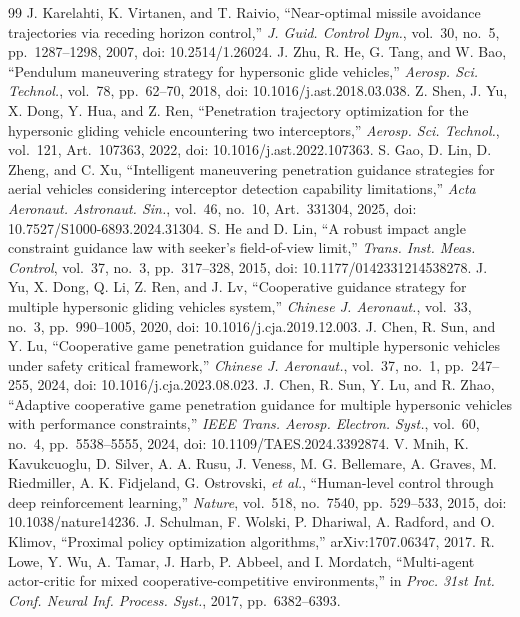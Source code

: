 \documentclass[unbranded]{cja}
\begin{document}
\begin{thebibliography}{99}
J. Karelahti, K. Virtanen, and T. Raivio, ``Near-optimal missile avoidance trajectories via receding horizon control,'' \textit{J. Guid. Control Dyn.}, vol.~30, no.~5, pp.~1287--1298, 2007, doi: 10.2514/1.26024.
J. Zhu, R. He, G. Tang, and W. Bao, ``Pendulum maneuvering strategy for hypersonic glide vehicles,'' \textit{Aerosp. Sci. Technol.}, vol.~78, pp.~62--70, 2018, doi: 10.1016/j.ast.2018.03.038.
Z. Shen, J. Yu, X. Dong, Y. Hua, and Z. Ren, ``Penetration trajectory optimization for the hypersonic gliding vehicle encountering two interceptors,'' \textit{Aerosp. Sci. Technol.}, vol.~121, Art.~107363, 2022, doi: 10.1016/j.ast.2022.107363.
S. Gao, D. Lin, D. Zheng, and C. Xu, ``Intelligent maneuvering penetration guidance strategies for aerial vehicles considering interceptor detection capability limitations,'' \textit{Acta Aeronaut. Astronaut. Sin.}, vol.~46, no.~10, Art.~331304, 2025, doi: 10.7527/S1000-6893.2024.31304.
S. He and D. Lin, ``A robust impact angle constraint guidance law with seeker's field-of-view limit,'' \textit{Trans. Inst. Meas. Control}, vol.~37, no.~3, pp.~317--328, 2015, doi: 10.1177/0142331214538278.
J. Yu, X. Dong, Q. Li, Z. Ren, and J. Lv, ``Cooperative guidance strategy for multiple hypersonic gliding vehicles system,'' \textit{Chinese J. Aeronaut.}, vol.~33, no.~3, pp.~990--1005, 2020, doi: 10.1016/j.cja.2019.12.003.
J. Chen, R. Sun, and Y. Lu, ``Cooperative game penetration guidance for multiple hypersonic vehicles under safety critical framework,'' \textit{Chinese J. Aeronaut.}, vol.~37, no.~1, pp.~247--255, 2024, doi: 10.1016/j.cja.2023.08.023.
J. Chen, R. Sun, Y. Lu, and R. Zhao, ``Adaptive cooperative game penetration guidance for multiple hypersonic vehicles with performance constraints,'' \textit{IEEE Trans. Aerosp. Electron. Syst.}, vol.~60, no.~4, pp.~5538--5555, 2024, doi: 10.1109/TAES.2024.3392874.
V. Mnih, K. Kavukcuoglu, D. Silver, A. A. Rusu, J. Veness, M. G. Bellemare, A. Graves, M. Riedmiller, A. K. Fidjeland, G. Ostrovski, \textit{et al.}, ``Human-level control through deep reinforcement learning,'' \textit{Nature}, vol.~518, no.~7540, pp.~529--533, 2015, doi: 10.1038/nature14236.
J. Schulman, F. Wolski, P. Dhariwal, A. Radford, and O. Klimov, ``Proximal policy optimization algorithms,'' arXiv:1707.06347, 2017.
R. Lowe, Y. Wu, A. Tamar, J. Harb, P. Abbeel, and I. Mordatch, ``Multi-agent actor-critic for mixed cooperative-competitive environments,'' in \textit{Proc. 31st Int. Conf. Neural Inf. Process. Syst.}, 2017, pp.~6382--6393.

\end{thebibliography}
\end{document}
